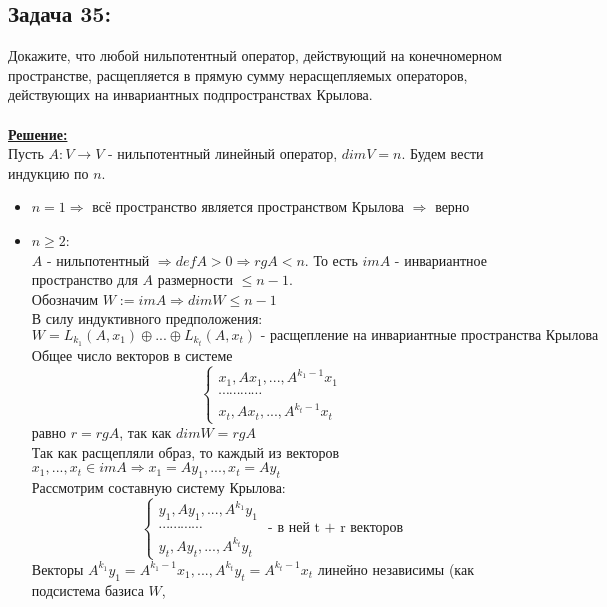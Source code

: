 \documentclass[a4paper,12pt,titlepage,final]{article}
\begin{document}
\subsection*{Задача 35:}
\noindent Докажите, что любой нильпотентный оператор, действующий на конечномерном пространстве,
расщепляется в прямую сумму нерасщепляемых операторов, действующих на инвариантных подпространствах Крылова. \\ \\
\textbf{\underline{Решение:}} \\
Пусть $A: V \rightarrow V$ - нильпотентный линейный оператор, $dimV = n$. Будем вести индукцию по $n$. 
\begin{itemize}
    \item $n = 1 \Rightarrow$ всё пространство является пространством Крылова $\Rightarrow$ верно
    \item $n \geq 2$: \\
    $A$ - нильпотентный $\Rightarrow defA > 0 \Rightarrow rgA < n$. То есть $imA$ - инвариантное пространство 
    для $A$ размерности $\leq n - 1$. \\
    Обозначим $W := imA \Rightarrow dimW \leq n - 1$ \\
    В силу индуктивного предположения:
    $$W = L_{k_1}(A, x_1) \oplus ... \oplus L_{k_t}(A, x_t) \text{ - расщепление на инвариантные пространства Крылова}$$
    Общее число векторов в системе 
    $$
    \begin{cases}
        x_1, Ax_1, ... , A^{k_1 - 1} x_1 \\
        \cdots \cdots \cdots \cdots \\
        x_t , Ax_t, ... , A^{k_t - 1} x_t
    \end{cases}
    $$
    равно $r = rgA$, так как $dimW = rgA$ \\
    Так как расщепляли образ, то каждый из векторов $x_1, ... , x_t \in imA \Rightarrow x_1 = Ay_1, ... , x_t = Ay_t$ \\
    Рассмотрим составную систему Крылова:
    $$
    \begin{cases}
        y_1, Ay_1, ... , A^{k_1} y_1 \\
        \cdots \cdots \cdots \cdots \\
        y_t , Ay_t, ... , A^{k_t} y_t
    \end{cases}
    \text{ - в ней t + r векторов}
    $$
    Векторы $A^{k_1}y_1 = A^{k_1 - 1}x_1, ... , A^{k_t}y_t = A^{k_t - 1}x_t$ линейно независимы (как подсистема базиса $W$, 

\end{itemize}
\end{document}
